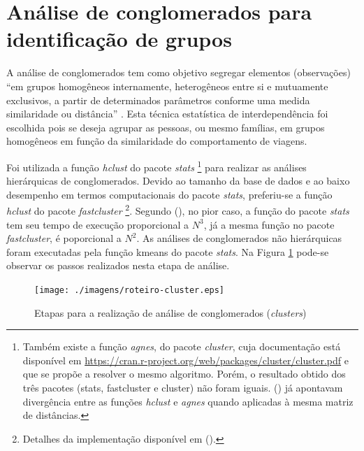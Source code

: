 

\clearpage
\section{Análise de conglomerados para identificação de grupos}\label{sec:analises-clusters}

A análise de conglomerados tem como objetivo segregar elementos (observações) “em grupos homogêneos internamente, heterogêneos entre si e mutuamente exclusivos, a partir de determinados parâmetros conforme uma medida similaridade ou distância” \cite[p.196]{FAVERO2009}.  Esta técnica estatística de interdependência foi escolhida pois se deseja agrupar as pessoas, ou mesmo famílias, em grupos homogêneos em função da similaridade do comportamento de viagens.


Foi utilizada a função \textit{hclust} do pacote \textit{stats}
\footnote{Também existe a função \textit{agnes}, do pacote \textit{cluster}, cuja documentação está disponível em \url{https://cran.r-project.org/web/packages/cluster/cluster.pdf} e que se propõe a resolver o mesmo algoritmo. Porém, o resultado obtido dos três pacotes (stats, fastcluster e cluster) não foram iguais.  (\citeyear{MURTAGH1975}) já apontavam divergência entre as funções \textit{hclust} e \textit{agnes} quando aplicadas à mesma matriz de distâncias.} \cite{RTEAM2011} para realizar as análises hierárquicas de conglomerados. Devido ao tamanho da base de dados e ao baixo desempenho em termos computacionais do pacote \textit{stats}, preferiu-se a função \textit{hclust} do pacote \textit{fastcluster}
\footnote{Detalhes da implementação disponível em  (\citeyear{MULLNER2011}).}. 
Segundo  (\citeyear{MULLNER2013}), no pior caso, a função do pacote \textit{stats} tem seu tempo de execução proporcional a $N^3$, já a mesma função no pacote \textit{fastcluster}, é poporcional a $N^2$. As análises de conglomerados não hierárquicas foram executadas pela função kmeans do pacote \textit{stats}. Na Figura \ref{fig:roteiro-cluster} pode-se observar os passos realizados nesta etapa de análise.

\begin{figure}[htb]%
    \caption{\label{fig:roteiro-cluster}Etapas para a realização de análise de conglomerados (\textit{clusters})}%
    \begin{center}%
        \texttt{[image: ./imagens/roteiro-cluster.eps]}%
    \end{center}%
\end{figure}%


